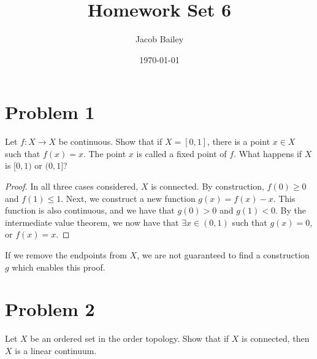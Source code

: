 \documentclass[11pt]{article}
\author{Jacob Bailey}
\date{\today}
\title{Homework Set 6}
\begin{document}
\maketitle

\section{Problem 1}
\label{sec:orga73d30a}

Let \(f: X\rightarrow X\) be continuous. Show that if \(X = [0, 1]\), there is a
point \(x\in X\) such that \(f(x) = x\). The point \(x\) is called a fixed
point of \(f\). What happens if \(X\) is \([0,1)\) or \((0, 1]\)?


\begin{proof}
In all three cases considered, \(X\) is connected. By construction, \(f(0) \geq 0\)
and \(f(1) \leq 1\). Next, we construct a new function \(g(x) = f(x) - x\). This
function is also continuous, and we have that \(g(0) > 0\) and \(g(1) < 0\). By the
intermediate value theorem, we now have that \(\exists x \in (0,1)\) such that
\(g(x) = 0\), or \(f(x) = x\).
\end{proof}

If we remove the endpoints from \(X\), we are not guaranteed to find a
construction \(g\) which enables this proof. 
\section{Problem 2}
\label{sec:org12ca487}

Let \(X\) be an ordered set in the order topology. Show that if \(X\) is connected,
then \(X\) is a linear continuum. 
\end{document}

